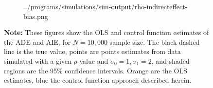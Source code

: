 \begin{figure}[h!]
\begin{subfigure}[c]{0.475\textwidth}
{            ../programs/simulations/sim-output/rho-indirecteffect-bias.png}
    \end{subfigure}
    \label{fig:rho-bias}
    \justify
    \footnotesize    
    \textbf{Note:}
    These figures show the OLS and control function estimates of the ADE and AIE, for $N = 10,000$ sample size.
    The black dashed line is the true value, points are points estimates from data simulated with a given $\rho$ value and $\sigma_0 = 1, \sigma_1 = 2$, and shaded regions are the 95\% confidence intervals.
    Orange are the OLS estimates, blue the control function approach described herein.
\end{figure}

